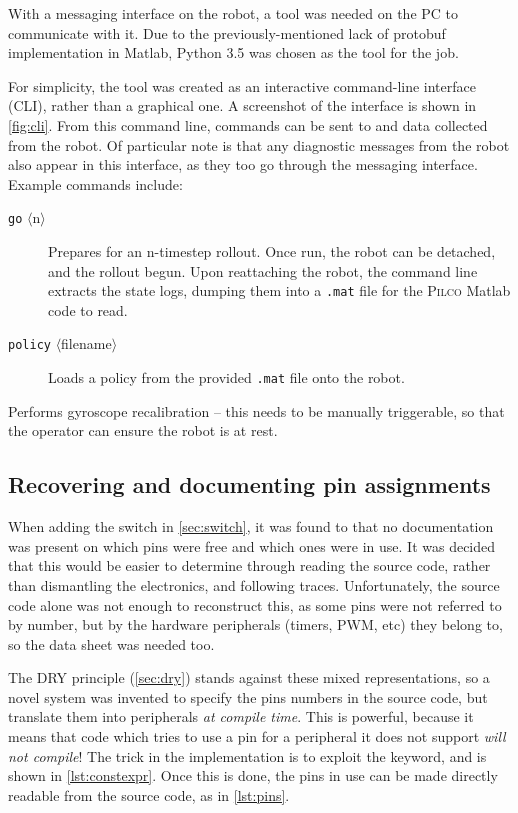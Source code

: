\documentclass[main.tex]{subfiles}
\begin{document}
		With a messaging interface on the robot, a tool was needed on the PC to communicate with it.
		Due to the previously-mentioned lack of protobuf implementation in Matlab, Python 3.5 was chosen as the tool for the job.

		For simplicity, the tool was created as an interactive command-line interface (CLI), rather than a graphical one.
		A screenshot of the interface is shown in \cref{fig:cli}.
		From this command line, commands can be sent to and data collected from the robot.
		Of particular note is that any diagnostic messages from the robot also appear in this interface, as they too go through the messaging interface. Example commands include:
		\begin{description}
			\item[\texttt{go} $\langle$n$\rangle$]
				Prepares for an n-timestep rollout. Once run, the robot can be detached, and the rollout begun. Upon reattaching the robot, the command line extracts the state logs, dumping them into a \texttt{.mat} file for the \textsc{Pilco} Matlab code to read.
			\item[\texttt{policy}  $\langle$filename$\rangle$]
				Loads a policy from the provided \texttt{.mat} file onto the robot.
		\end{description}

		\begin{description}[topsep = \itemsep]
			\item[\texttt{calibrate}]
				Performs gyroscope recalibration -- this needs to be manually triggerable, so that the operator can ensure the robot is at rest.
		\end{description}

\subsection{Recovering and documenting pin assignments}
	\label{sec:pins}

	When adding the switch in \cref{sec:switch}, it was found to that no documentation was present on which pins were free and which ones were in use. It was decided that this would be easier to determine through reading the source code, rather than dismantling the electronics, and following traces.
	Unfortunately, the source code alone was not enough to reconstruct this, as some pins were not referred to by number, but by the hardware peripherals (timers, PWM, etc) they belong to, so the data sheet was needed too.

	The DRY principle (\cref{sec:dry}) stands against these mixed representations, so a novel system was invented to specify the pins numbers in the source code, but translate them into peripherals \emph{at compile time}.
	This is powerful, because it means that code which tries to use a pin for a peripheral it does not support \emph{will not compile}! The trick in the implementation is to exploit the  keyword, and is shown in \cref{lst:constexpr}.
	Once this is done, the pins in use can be made directly readable from the source code, as in \cref{lst:pins}.
\end{document}
